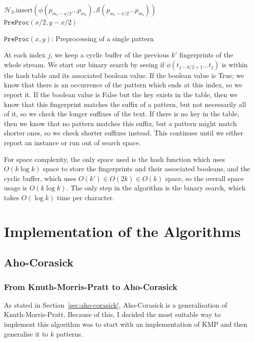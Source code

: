 \documentclass[ %
                    author={Dominic Joseph Moylett},
                    degree={MEng},
                     title={Dictionary Matching with Fingerprints},
                  subtitle={An Empirical Analysis},
                      type={research},
                      year={2015} ]{dissertation}
\begin{document}
\begin{algorithm}[t]
 {
  $\mathcal{H}_3.\text{insert}(\phi(p_{m_i-x/2}...p_{m_i}), \mathcal{S}(p_{m_i-x/2}...p_{m_i}))$\\
  $\texttt{PreProc}(x/2,y - x/2)$
}
\caption{$\texttt{PreProc}(x,y)$: Preprocessing of a single pattern}
\label{alg:short-dict-matching}
\end{algorithm}

At each index $j$, we keep a cyclic buffer of the previous $k'$ fingerprints of the whole stream. We start our binary search by seeing if $\phi(t_{j - k/2 + 1}...t_j)$ is within the hash table and its associated boolean value. If the boolean value is True; we know that there is an occurrence of the pattern which ends at this index, so we report it. If the boolean value is False but the key exists in the table, then we know that this fingerprint matches the suffix of a pattern, but not necessarily all of it, so we check the longer suffixes of the text. If there is no key in the table, then we know that no pattern matches this suffix, but a pattern might match shorter ones, so we check shorter suffixes instead. This continues until we either report an instance or run out of search space.

For space complexity, the only space used is the hash function which uses $O(k\log k)$ space to store the fingerprints and their associated booleans, and the cyclic buffer, which uses $O(k') \in O(2k) \in O(k)$ space, so the overall space usage is $O(k\log k)$. The only step in the algorithm is the binary search, which takes $O(\log k)$ time per character.


\chapter{Implementation of the Algorithms}
\label{chap:execution}

\section{Aho-Corasick}

\subsection{From Knuth-Morris-Pratt to Aho-Corasick}

As stated in Section~\ref{sec:aho-corasick}, Aho-Corasick \cite{Aho:1975:ESM:360825.360855} is a generalisation of Knuth-Morris-Pratt. Because of this, I decided the most suitable way to implement this algorithm was to start with an implementation of KMP and then generalise it to $k$ patterns.
\end{document}
